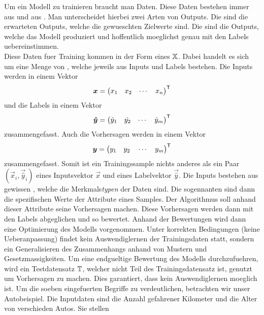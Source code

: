 Um ein Modell zu trainieren braucht man Daten. Diese Daten bestehen immer aus
 und aus . Man unterscheidet hierbei zwei Arten
von Outputs. Die  sind die erwarteten Outputs, welche die
gewueschten Zielwerte sind. Die  sind die Outputs, welche
das Modell produziert und hoffentlich moeglichst genau mit den Labels
uebereinstimmen. \\
Diese Daten fuer Training kommen in der Form eines  $\mathbb{X}$.
Dabei handelt es sich um eine Menge von ,
welche jeweils aus Inputs und Labels bestehen.
Die Inputs werden in einem Vektor
\[ \bm{x} = \begin{pmatrix} x_1 & x_2 & \cdots & x_n \end{pmatrix}^{\mathsf{T}} \]
und die Labels in einem Vektor
\[ \bm{\hat{y}} = \begin{pmatrix} \hat{y}_1 & \hat{y_2} & \cdots & \hat{y}_m \end{pmatrix}^{\mathsf{T}} \]
zusammengefasst. Auch die Vorhersagen werden in einem Vektor
\[\bm{y} = \begin{pmatrix} y_1 \quad y_2 \quad \cdots \quad y_m \end{pmatrix}^{\mathsf{T}} \]
zusammengefasst.
Somit ist ein Trainingssample nichts anderes als ein Paar
$(\vec{x}_i,\vec{\hat{y}}_i)$ eines Inputsvektor $\vec{x}$ und eines Labelvektor
$\vec{\hat{y}}$.
\para{}
Die Inputs bestehen aus gewissen , welche die
Merkmals\textit{typen} der Daten sind. Die sogennanten  sind
dann die spezifischen Werte der Attribute eines Samples. Der Algorithmus soll
anhand dieser Attribute seine Vorhersagen machen.
Diese Vorhersagen werden dann mit den Labels abgeglichen und so bewertet.
Anhand der Bewertungen wird dann eine Optimierung des Modells vorgenommen.
Unter korrekten Bedingungen (keine Ueberanpassung) findet kein Auswendiglernen der Trainingsdaten statt,
sondern ein Generalisieren des Zusammenhangs anhand von Mustern und Gesetzmassigkeiten.
\para{}
Um eine endgueltige Bewertung des Modells durchzufuehren, wird ein Testdatensatz
$\mathbb{T}$, welcher nicht Teil des Trainingsdatensatz ist, genutzt um Vorhersagen zu machen.
Dies garantiert, dass kein Auswendiglernen moeglich ist.
\para{}
Um die soeben eingefuerten Begriffe zu verdeutlichen, betrachten wir unser Autobeispiel.
Die Inputdaten sind die Anzahl gefahrener Kilometer und die Alter von
verschieden Autos. Sie stellen


